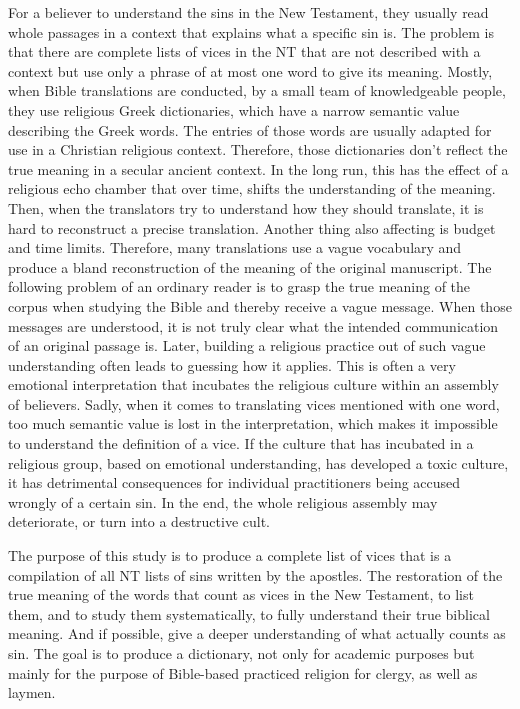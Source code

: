 For a believer to understand the sins in the New Testament, they usually read
whole passages in a context that explains what a specific sin is. The problem is
that there are complete lists of vices in the NT that are not described with 
a context but use only a phrase of at most one word to give its
meaning. Mostly, when Bible translations are conducted, by a small team of knowledgeable 
people, they use religious Greek dictionaries, which have a narrow semantic value 
describing the Greek words. The entries of those words are usually adapted for 
use in a Christian religious context. Therefore, those dictionaries don't reflect
the true meaning in a secular ancient context. In the long run, this has the effect
of a religious echo chamber that over time, shifts the understanding of the
meaning. Then, when the translators try to understand how they should translate,
it is hard to reconstruct a precise translation. Another thing also affecting
is budget and time limits. Therefore, many translations use a vague vocabulary
and produce a bland reconstruction of the meaning of the original manuscript.
The following problem of an ordinary reader is to grasp the true meaning of the
corpus when studying the Bible and thereby receive a vague message. When those
messages are understood, it is not truly clear what the intended communication of 
an original passage is. Later, building a religious practice out of such vague 
understanding often leads to guessing how it applies. This is often a very emotional 
interpretation that incubates the religious culture within an assembly of believers.
Sadly, when it comes to translating vices mentioned with one word, too much semantic
value is lost in the interpretation, which makes it impossible to understand the definition
of a vice. If the culture that has incubated in a religious group,
based on emotional understanding, has developed a toxic culture, it has
detrimental consequences for individual practitioners being accused wrongly of a
certain sin. In the end, the whole religious assembly may deteriorate, or turn into
a destructive cult.

The purpose of this study is to produce a complete list of vices that is a compilation of
all NT lists of sins written by the apostles. The restoration of the true meaning of the
words that count as vices in the New Testament, to list them, and to study them systematically, 
to fully understand their true biblical meaning. And if possible, give a deeper understanding 
of what actually counts as sin. The goal is to produce a dictionary, not only for academic purposes
but mainly for the purpose of Bible-based practiced religion for clergy, as well as laymen.
